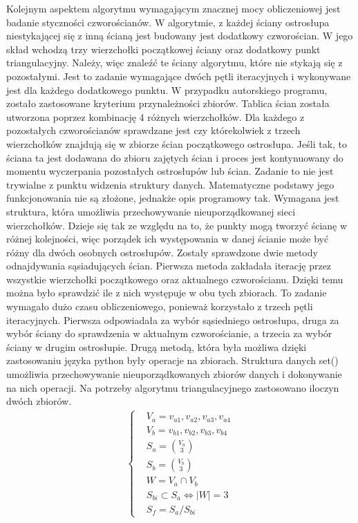 Kolejnym aspektem algorytmu wymagającym znacznej mocy obliczeniowej jest badanie styczności czworościanów. W algorytmie, z każdej ściany ostrosłupa niestykającej się z inną ścianą jest budowany jest dodatkowy czworościan. W jego skład wchodzą trzy wierzchołki początkowej ściany oraz dodatkowy punkt triangulacyjny. Należy, więc znaleźć te ściany algorytmu, które nie stykają się z pozostałymi. Jest to zadanie wymagające dwóch pętli iteracyjnych i wykonywane jest dla każdego dodatkowego punktu. W przypadku autorskiego programu, zostało zastosowane kryterium przynależności zbiorów. Tablica ścian została utworzona poprzez kombinację 4 różnych wierzchołków. Dla każdego z pozostałych czworościanów sprawdzane jest czy którekolwiek z trzech wierzchołków znajdują się w zbiorze ścian początkowego ostrosłupa. Jeśli tak, to ściana ta jest dodawana do zbioru zajętych ścian i proces jest kontynuowany do momentu wyczerpania pozostałych ostrosłupów lub ścian. Zadanie to nie jest trywialne z punktu widzenia struktury danych. Matematyczne podstawy jego funkcjonowania nie są złożone, jednakże opis programowy tak. Wymagana jest struktura, która umożliwia przechowywanie nieuporządkowanej sieci wierzchołków. Dzieje się tak ze względu na to, że punkty mogą tworzyć ścianę w różnej kolejności, więc porządek ich występowania w danej ścianie może być różny dla dwóch osobnych ostrosłupów. Zostały sprawdzone dwie metody odnajdywania sąsiadujących ścian.
\newline \indent Pierwsza metoda zakładała iterację przez wszystkie wierzchołki początkowego oraz aktualnego czworościanu. Dzięki temu można było sprawdzić ile z nich występuje w obu tych zbiorach. To zadanie wymagało dużo czasu obliczeniowego, ponieważ korzystało z trzech pętli iteracyjnych. Pierwsza odpowiadała za wybór sąsiedniego ostrosłupa, druga za wybór ściany do sprawdzenia w aktualnym czworościanie, a trzecia za wybór ściany w drugim ostrosłupie.
\newline \indent Drugą metodą, która była możliwa dzięki zastosowaniu języka python były operacje na zbiorach. Struktura danych set() umożliwia przechowywanie nieuporządkowanych zbiorów danych i dokonywanie na nich operacji. Na potrzeby algorytmu triangulacyjnego zastosowano iloczyn dwóch zbiorów.
\begin{equation}
    \begin{aligned}
    \begin{cases}
    &V_{a}={v_{a1},v_{a2},v_{a3},v_{a4}}\\
    &V_{b}={v_{b1},v_{b2},v_{b3},v_{b4}}\\
    &S_{a}=\binom{V_{a}}{3}\\
    &S_{b}=\binom{V_{b}}{3}\\
    &W=V_{a} \cap V_{b}\\
    &S_{bi} 	\subset S_{a} \Leftrightarrow |W|=3\\
    &S_{f}=S_{a}/S_{bi}
    \end{cases}
    \end{aligned}
\end{equation}
